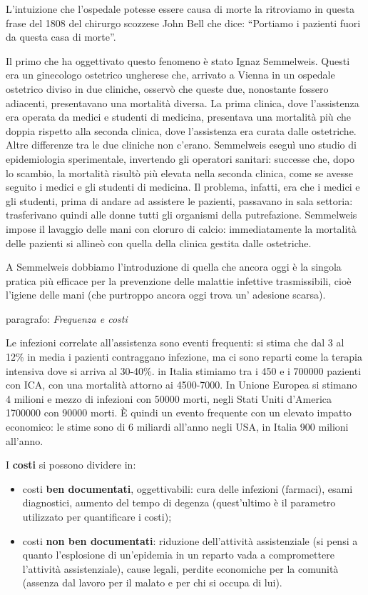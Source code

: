 \documentclass[]{article}
\begin{document}
L'intuizione che l'ospedale potesse essere causa di morte la ritroviamo
in questa frase del 1808 del chirurgo scozzese John Bell che dice:
``Portiamo i pazienti fuori da questa casa di morte''.

Il primo che ha oggettivato questo fenomeno è stato Ignaz Semmelweis.
Questi era un ginecologo ostetrico ungherese che, arrivato a Vienna in
un ospedale ostetrico diviso in due cliniche, osservò che queste due,
nonostante fossero adiacenti, presentavano una mortalità diversa. La
prima clinica, dove l'assistenza era operata da medici e studenti di
medicina, presentava una mortalità più che doppia rispetto alla seconda
clinica, dove l'assistenza era curata dalle ostetriche. Altre differenze
tra le due cliniche non c'erano. Semmelweis eseguì uno studio di
epidemiologia sperimentale, invertendo gli operatori sanitari: successe
che, dopo lo scambio, la mortalità risultò più elevata nella seconda
clinica, come se avesse seguito i medici e gli studenti di medicina. Il
problema, infatti, era che i medici e gli studenti, prima di andare ad
assistere le pazienti, passavano in sala settoria: trasferivano quindi
alle donne tutti gli organismi della putrefazione. Semmelweis impose il
lavaggio delle mani con cloruro di calcio: immediatamente la mortalità
delle pazienti si allineò con quella della clinica gestita dalle
ostetriche.

A Semmelweis dobbiamo l'introduzione di quella che ancora oggi è la
singola pratica più efficace per la prevenzione delle malattie infettive
trasmissibili, cioè l'igiene delle mani (che purtroppo ancora oggi trova
un' adesione scarsa).

paragrafo: \emph{Frequenza e costi}

Le infezioni correlate all'assistenza sono eventi frequenti: si stima
che dal 3 al 12\% in media i pazienti contraggano infezione, ma ci sono
reparti come la terapia intensiva dove si arriva al 30-40\%. in Italia
stimiamo tra i 450 e i 700000 pazienti con ICA, con una mortalità
attorno ai 4500-7000. In Unione Europea si stimano 4 milioni e mezzo di
infezioni con 50000 morti, negli Stati Uniti d'America 1700000 con 90000
morti. È quindi un evento frequente con un elevato impatto economico: le
stime sono di 6 miliardi all'anno negli USA, in Italia 900 milioni
all'anno.

I \textbf{costi} si possono dividere in:

\begin{itemize}
\item
  costi \textbf{ben documentati}, oggettivabili: cura delle infezioni
  (farmaci), esami diagnostici, aumento del tempo di degenza
  (quest'ultimo è il parametro utilizzato per quantificare i costi);
\item
  costi \textbf{non ben documentati}: riduzione dell'attività
  assistenziale (si pensi a quanto l'esplosione di un'epidemia in un
  reparto vada a compromettere l'attività assistenziale), cause legali,
  perdite economiche per la comunità (assenza dal lavoro per il malato e
  per chi si occupa di lui).
\end{itemize}
\end{document}
